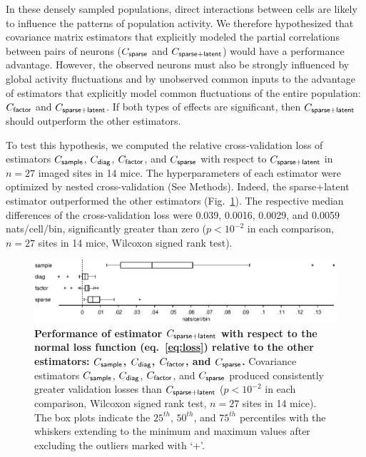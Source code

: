 \documentclass[10pt]{article}
\begin{document}
In these densely sampled populations, direct interactions between cells are likely to influence the patterns of population activity.  We therefore hypothesized that covariance matrix estimators that explicitly modeled the partial correlations between pairs of neurons ($C_{\sf sparse}$ and $C_{\sf sparse+latent}$) would have a performance advantage.  However, the observed neurons must also be strongly influenced by global activity fluctuations and by unobserved common inputs to the advantage of estimators that explicitly model common fluctuations of the entire population: $C_{\sf factor}$ and $C_{\sf sparse+latent}$.  If both types of effects are significant, then $C_{\sf sparse+latent}$ should outperform the other estimators.

To test this hypothesis, we computed the relative cross-validation loss of estimators  $C_{\sf sample}$, $C_{\sf diag}$, $C_{\sf factor}$, and $C_{\sf sparse}$ with respect to $C_{\sf sparse+latent}$ in $n=27$ imaged sites in 14 mice.  The hyperparameters of each estimator were optimized by nested cross-validation (See Methods). Indeed, the sparse+latent estimator outperformed the other estimators (Fig.~\ref{fig:3}). The respective median differences of the cross-validation loss were 0.039, 0.0016, 0.0029, and 0.0059 nats/cell/bin, significantly greater than zero ($p<10^{-2}$ in each comparison, $n=27$ sites in 14 mice, Wilcoxon signed rank test).  

\begin{figure}[!ht]
    \begin{center}
    \includegraphics{./figures/src/Fig3.eps}
    \end{center}
    \caption{
   {\bf Performance of estimator $C_{\sf sparse+latent}$ with respect to the normal loss function (eq.~\ref{eq:loss}) relative to the other estimators: $C_{\sf sample}$, $C_{\sf diag}$, $C_{\sf factor}$, and $C_{\sf sparse}$.} 
    Covariance estimators $C_{\sf sample}$, $C_{\sf diag}$, $C_{\sf factor}$, and $C_{\sf sparse}$ produced consistently greater validation losses than $C_{\sf sparse+latent}$ ($p<10^{-2}$ in each comparison, Wilcoxon signed rank test, $n=27$ sites in 14 mice). The box plots indicate the $25^{th}$, $50^{th}$, and $75^{th}$ percentiles with the whiskers extending to the minimum and maximum values after excluding the outliers marked with `+'. 
} \label{fig:3}
\end{figure}
\end{document}
